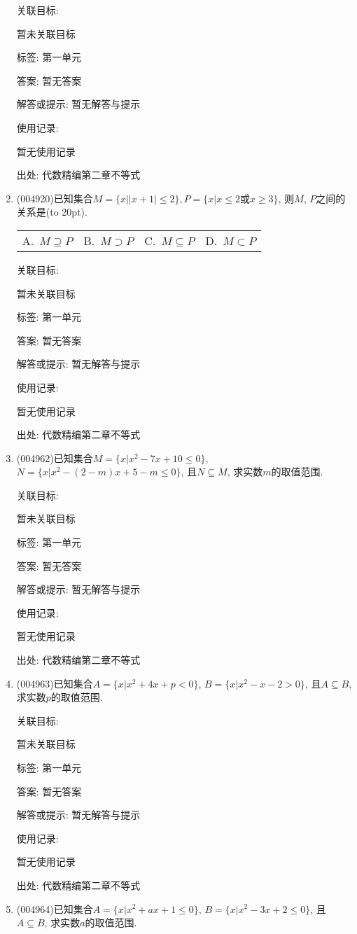 \documentclass[10pt,a4paper]{article}
\newcommand{\bracket}[1]{(\hbox to #1pt{})}
\newcommand{\fourch}[4]{\par\begin{tabular}{p{.23\textwidth}p{.23\textwidth}p{.23\textwidth}p{.23\textwidth}}
A.~#1 &B.~#2& C.~#3& D.~#4
\end{tabular}}
\begin{document}
\begin{enumerate}[1.]
关联目标:

暂未关联目标



标签: 第一单元

答案: 暂无答案

解答或提示: 暂无解答与提示

使用记录:

暂无使用记录


出处: 代数精编第二章不等式
\item { (004920)}已知集合$M=\{x||x+1|\le 2\},P=\{x|x\le 2$或$x\ge 3\}$, 则$M$, $P$之间的关系是\bracket{20}.
\fourch{$M\supseteq P$}{$M\supset P$}{$M\subseteq P$}{$M\subset P$}


关联目标:

暂未关联目标



标签: 第一单元

答案: 暂无答案

解答或提示: 暂无解答与提示

使用记录:

暂无使用记录


出处: 代数精编第二章不等式
\item { (004962)}已知集合$M=\{x|x^2-7x+10\le 0\}$, $N=\{x|x^2-(2-m)x+5-m\le 0\}$, 且$N\subseteq M$, 求实数$m$的取值范围.


关联目标:

暂未关联目标



标签: 第一单元

答案: 暂无答案

解答或提示: 暂无解答与提示

使用记录:

暂无使用记录


出处: 代数精编第二章不等式
\item { (004963)}已知集合$A=\{x|x^2+4x+p<0\}$, $B=\{x|x^2-x-2>0\}$, 且$A\subseteq B$, 求实数$p$的取值范围.


关联目标:

暂未关联目标



标签: 第一单元

答案: 暂无答案

解答或提示: 暂无解答与提示

使用记录:

暂无使用记录


出处: 代数精编第二章不等式
\item { (004964)}已知集合$A=\{x|x^2+ax+1\le 0\}$, $B=\{x|x^2-3x+2\le 0\}$, 且$A\subseteq B$, 求实数$a$的取值范围.



\end{enumerate}
\end{document}

